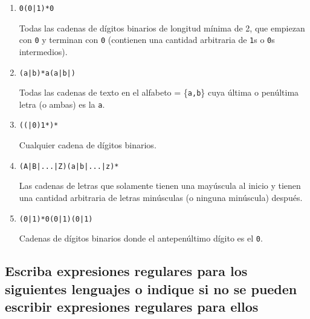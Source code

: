 \documentclass[a4paper, twoside, 12pt]{article}
\begin{document}
\begin{enumerate}
    \item \texttt{0(0|1)*0}
    
    Todas las cadenas de dígitos binarios de longitud mínima de 2, que empiezan con \texttt{0} y terminan con \texttt{0} (contienen una cantidad arbitraria de \texttt{1}s o \texttt{0}s intermedios).
    
    \item \texttt{(a|b)*a(a|b|\textepsilon)}
    
    Todas las cadenas de texto en el alfabeto \textSigma = \{\texttt{a,b}\} cuya última o penúltima letra (o ambas) es la \texttt{a}.
    
    \item \texttt{((\textepsilon|0)1*)*}

    Cualquier cadena de dígitos binarios.
    
    \item \texttt{(A|B|...|Z)(a|b|...|z)*}

    Las cadenas de letras que solamente tienen una mayúscula al inicio y tienen una cantidad arbitraria de letras minúsculas (o ninguna minúscula) después.
    
    \item \texttt{(0|1)*0(0|1)(0|1)}

    Cadenas de dígitos binarios donde el antepenúltimo dígito es el \texttt{0}.
\end{enumerate}


\subsection{Escriba expresiones regulares para los siguientes lenguajes o indique si no se pueden escribir expresiones regulares para ellos}
\end{document}
